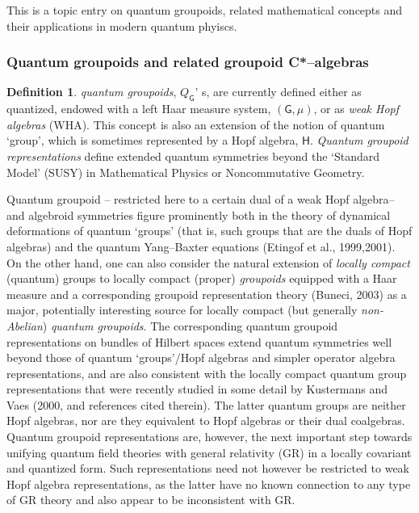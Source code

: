 \documentclass[12pt]{article}
\theoremstyle{plain}
\theoremstyle{definition}
\newtheorem{definition}{Definition}[section]
\numberwithin{equation}{section}
\newcommand{\grp}{{\mathsf{G}}}
\newcommand{\<}{{\langle}}
\begin{document}
This is a topic entry on quantum groupoids, related mathematical concepts
and their applications in modern quantum phyiscs. 

\subsubsection{Quantum groupoids and related groupoid C*--algebras}

\begin{definition} \emph{quantum groupoids}, $Q_{\grp}$' s, are currently defined either as quantized,  endowed with a left Haar measure system, $(\grp,\mu)$, or as \emph{weak Hopf algebras} (WHA). This concept is also an extension of the notion of quantum `group', which is sometimes represented by a Hopf algebra, $\mathsf{H}$. \emph{Quantum groupoid representations} define extended quantum symmetries beyond the `Standard Model' (SUSY) in Mathematical Physics or Noncommutative Geometry.
\end{definition}

  Quantum groupoid -- restricted here to a certain dual of a weak Hopf algebra-- and algebroid symmetries figure prominently both in the theory of dynamical deformations of quantum `groups' (that is, such groups that are the duals of Hopf algebras) and the quantum Yang--Baxter equations (Etingof et al., 1999,2001). On the other hand, one can also consider the natural extension of \emph{locally compact} (quantum) groups to locally compact (proper) \emph{groupoids} equipped with a Haar measure and a corresponding groupoid representation theory (Buneci, 2003) as a major, potentially interesting source for locally compact (but generally \emph{non-Abelian}) \emph{quantum groupoids}. The corresponding quantum groupoid representations on bundles of Hilbert spaces extend quantum symmetries well beyond those of quantum `groups'/Hopf algebras and simpler operator algebra representations, and are also consistent with the locally compact quantum group representations that were recently studied in some detail by Kustermans and Vaes (2000, and references cited therein).  The latter quantum groups are neither Hopf algebras, nor are they equivalent to Hopf algebras 
or their dual coalgebras. Quantum groupoid representations are, however, the next important 
step towards unifying quantum field theories with general relativity (GR) in a locally covariant 
and quantized form. Such representations need not however be restricted to weak Hopf algebra representations, as
the latter have no known connection to any type of GR theory and also appear to be inconsistent with GR.
\end{document}
